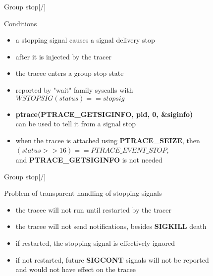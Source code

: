 \documentclass[unicode,aspectratio=169,xcolor={table,dvipsnames,usernames}]{beamer}
\begin{document}
\begin{frame}{\Large Group stop\hfill [\insertframenumber/\inserttotalframenumber]}
\Large
\begin{block}{Conditions}
\begin{itemize}
	\item a stopping signal causes a signal delivery stop
	\item after it is injected by the tracer
	\item the tracee enters a group stop state
	\item reported by "wait" family syscalls with \\
		$WSTOPSIG(status) == stopsig$
	\item \textbf{ptrace(PTRACE\_GETSIGINFO, pid, 0, \&siginfo)} \\
		can be used to tell it from a signal stop
	\item when the tracee is attached using \textbf{PTRACE\_SEIZE}, then \\
		$(status >> 16) == PTRACE\_EVENT\_STOP$, \\
		and \textbf{PTRACE\_GETSIGINFO} is not needed
\end{itemize}
\end{block}
\end{frame}

\begin{frame}{\Large Group stop\hfill [\insertframenumber/\inserttotalframenumber]}
\Large
\begin{block}{Problem of transparent handling of stopping signals}
\begin{itemize}
	\item the tracee will not run until restarted by the tracer
	\item the tracee will not send notifications, besides \textbf{SIGKILL} death
	\item if restarted, the stopping signal is effectively ignored
	\item if not restarted, future \textbf{SIGCONT} signals will not be reported \\
		and would not have effect on the tracee
\end{itemize}
\end{block}
\end{frame}
\end{document}
